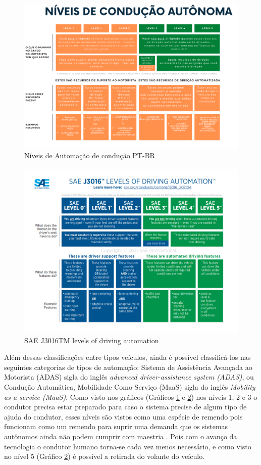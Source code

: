\begin{figure}[H]
\centering
\includegraphics[width=15cm]{Figures/IC-Graph1.png}
\caption{Níveis de Automação de condução PT-BR}
\label{Graph_PT}
\end{figure}
\begin{figure}[H]
\centering
\includegraphics[width=15cm]{Figures/IC-GrapEN.png}
\caption{SAE J3016TM levels of driving automation \cite{SAE}}
\label{Graph_EN}
\end{figure}

Além dessas classificações entre tipos veículos, ainda é possível classificá-los nas seguintes categorias de tipos de automação: Sistema de Assistência Avançada ao Motorista (ADAS) sigla do inglês \textit{advanced driver-assistance system (ADAS)}, ou Condução Automática, Mobilidade Como Serviço (MaaS) sigla do inglês \textit{Mobility as a service (MaaS)}.
Como visto nos gráficos (Gráficos \ref{Graph_PT} e \ref{Graph_EN}) nos níveis 1, 2 e 3 o condutor precisa estar preparado para caso o sistema precise de algum tipo de ajuda do condutor, esses níveis são vistos como uma espécie de remendo pois funcionam como um remendo para suprir uma demanda que os sistemas autônomos ainda não podem cumprir com maestria \cite{4cenarios_ocidental}. Pois com o avanço da tecnologia o condutor humano torna-se cada vez menos necessário, e como visto no nível 5 (Gráfico \ref{Graph_EN}) é possível a retirada do volante do veículo. 

